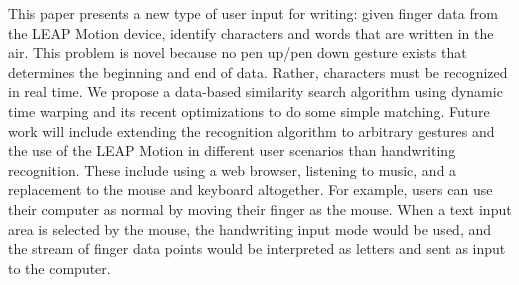 This paper presents a new type of user input for writing: given finger data from the LEAP Motion device, identify characters and words that are written in the air. This problem is novel because no pen up/pen down gesture exists that determines the beginning and end of data. Rather, characters must be recognized in real time. We propose a data-based similarity search algorithm using dynamic time warping and its recent optimizations to do some simple matching. Future work will include extending the recognition algorithm to arbitrary gestures and the use of the LEAP Motion in different user scenarios than handwriting recognition. These include using a web browser, listening to music, and a replacement to the mouse and keyboard altogether. For example, users can use their computer as normal by moving their finger as the mouse. When a text input area is selected by the mouse, the handwriting input mode would be used, and the stream of finger data points would be interpreted as letters and sent as input to the computer.\\

